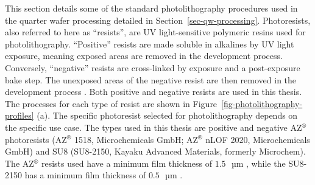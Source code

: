 \documentclass[
  a4paper,
]{scrbook}
\begin{document}
This section details some of the standard photolithography procedures
used in the quarter wafer processing detailed in
Section~\ref{sec-qw-processing}. Photoresists, also referred to here as
``resists'', are UV light-sensitive polymeric resins used for
photolithography. ``Positive'' resists are made soluble in alkalines by
UV light exposure, meaning exposed areas are removed in the development
process. Conversely, ``negative'' resists are cross-linked by exposure
and a post-exposure bake step. The unexposed areas of the negative
resist are then removed in the development process
\autocite{Microchemicals1}. Both positive and negative resists are used
in this thesis. The processes for each type of resist are shown in
Figure~\ref{fig-photolithography-profiles} (a). The specific photoresist
selected for photolithography depends on the specific use case. The
types used in this thesis are positive and negative AZ\(^\circledR\)
photoresists (AZ\(^\circledR\) 1518, Microchemicals GmbH;
AZ\(^\circledR\) nLOF 2020, Microchemicals GmbH) and SU8 (SU8-2150,
Kayaku Advanced Materials, formerly Microchem). The AZ\(^\circledR\)
resists used have a minimum film thickness of
\(1.5\textrm{ } \textrm{µm}\) \autocite{Microchemicals1}, while the
SU8-2150 has a minimum film thickness of \(0.5\textrm{ } \textrm{µm}\)
\autocite{Kayaku}.
\end{document}
